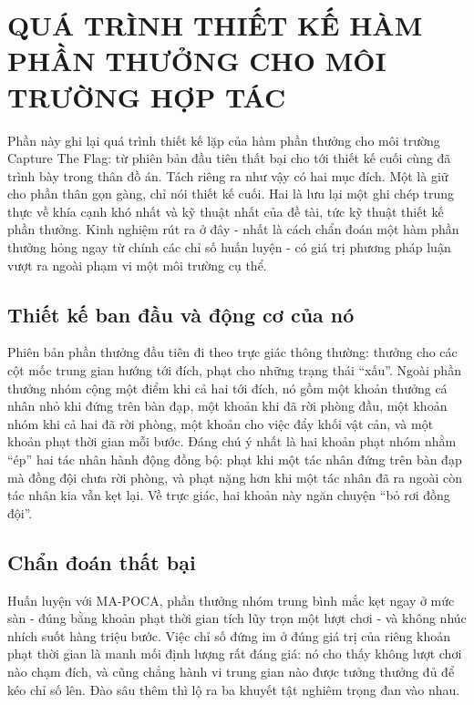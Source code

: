 \fontsize{13pt}{22.5pt}\selectfont


\section{QUÁ TRÌNH THIẾT KẾ HÀM PHẦN THƯỞNG CHO MÔI TRƯỜNG HỢP TÁC}
\label{ap:reward-process}

\indent Phần này ghi lại quá trình thiết kế lặp của hàm phần thưởng cho môi trường Capture
The Flag: từ phiên bản đầu tiên thất bại cho tới thiết kế cuối cùng đã trình bày trong
thân đồ án. Tách riêng ra như vậy có hai mục đích. Một là giữ cho phần thân gọn gàng, chỉ
nói thiết kế cuối. Hai là lưu lại một ghi chép trung thực về khía cạnh khó nhất và kỹ
thuật nhất của đề tài, tức kỹ thuật thiết kế phần thưởng. Kinh nghiệm rút ra ở đây - nhất
là cách chẩn đoán một hàm phần thưởng hỏng ngay từ chính các chỉ số huấn luyện - có giá
trị phương pháp luận vượt ra ngoài phạm vi một môi trường cụ thể.

\subsection{Thiết kế ban đầu và động cơ của nó}
\indent Phiên bản phần thưởng đầu tiên đi theo trực giác thông thường: thưởng cho các cột
mốc trung gian hướng tới đích, phạt cho những trạng thái ``xấu''. Ngoài phần thưởng nhóm
cộng một điểm khi cả hai tới đích, nó gồm một khoản thưởng cá nhân nhỏ khi đứng trên bàn
đạp, một khoản khi đã rời phòng đầu, một khoản nhóm khi cả hai đã rời phòng, một khoản cho
việc đẩy khối vật cản, và một khoản phạt thời gian mỗi bước. Đáng chú ý nhất là hai khoản
phạt nhóm nhằm ``ép'' hai tác nhân hành động đồng bộ: phạt khi một tác nhân đứng trên bàn
đạp mà đồng đội chưa rời phòng, và phạt nặng hơn khi một tác nhân đã ra ngoài còn tác nhân
kia vẫn kẹt lại. Về trực giác, hai khoản này ngăn chuyện ``bỏ rơi đồng đội''.

\subsection{Chẩn đoán thất bại}
\indent Huấn luyện với MA-POCA, phần thưởng nhóm trung bình mắc kẹt ngay ở mức sàn - đúng
bằng khoản phạt thời gian tích lũy trọn một lượt chơi - và không nhúc nhích suốt hàng
triệu bước. Việc chỉ số đứng im ở đúng giá trị của riêng khoản phạt thời gian là manh mối
định lượng rất đáng giá: nó cho thấy không lượt chơi nào chạm đích, và cũng chẳng hành vi
trung gian nào được tưởng thưởng đủ để kéo chỉ số lên. Đào sâu thêm thì lộ ra ba khuyết
tật nghiêm trọng đan vào nhau.

